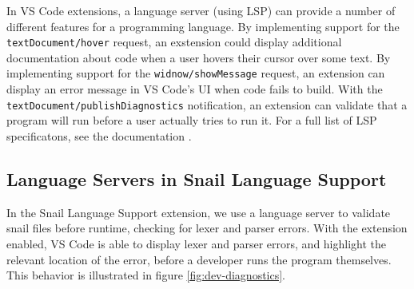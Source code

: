 \documentclass{article}
\begin{document}
In VS Code extensions, a language server (using LSP) can provide a number of different features for a programming language. By implementing support for the \lstinline{textDocument/hover} request, an exstension could display additional documentation about code when a user hovers their cursor over some text. By implementing support for the \lstinline{widnow/showMessage} request, an extension can display an error message in VS Code's UI when code fails to build. With the \lstinline{textDocument/publishDiagnostics} notification, an extension can validate that a program will run before a user actually tries to run it. For a full list of LSP specificatons, see the documentation \cite{Microsoft_2023i}.

\subsection{Language Servers in Snail Language Support}

In the Snail Language Support extension, we use a language server to validate snail files before runtime, checking for lexer and parser errors. With the extension enabled, VS Code is able to display lexer and parser errors, and highlight the relevant location of the error, before a developer runs the program themselves. This behavior is illustrated in figure \ref{fig:dev-diagnostics}. 
\end{document}
